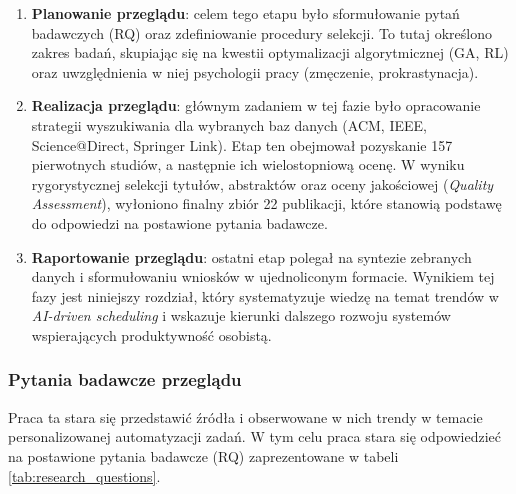 \begin{enumerate}
    \item \textbf{Planowanie przeglądu}: celem tego etapu było sformułowanie pytań badawczych (RQ) oraz zdefiniowanie procedury selekcji. To tutaj określono zakres badań, skupiając się na kwestii optymalizacji algorytmicznej (GA, RL) oraz uwzględnienia w niej psychologii pracy (zmęczenie, prokrastynacja).
    
    \item \textbf{Realizacja przeglądu}: głównym zadaniem w tej fazie było opracowanie strategii wyszukiwania dla wybranych baz danych (ACM, IEEE, Science@Direct, Springer Link). Etap ten obejmował pozyskanie 157 pierwotnych studiów, a następnie ich wielostopniową ocenę. W wyniku rygorystycznej selekcji tytułów, abstraktów oraz oceny jakościowej (\textit{Quality Assessment}), wyłoniono finalny zbiór 22 publikacji, które stanowią podstawę do odpowiedzi na postawione pytania badawcze.
    
    \item \textbf{Raportowanie przeglądu}: ostatni etap polegał na syntezie zebranych danych i sformułowaniu wniosków w ujednoliconym formacie. Wynikiem tej fazy jest niniejszy rozdział, który systematyzuje wiedzę na temat trendów w \textit{AI-driven scheduling} i wskazuje kierunki dalszego rozwoju systemów wspierających produktywność osobistą.
\end{enumerate}

    \subsubsection{Pytania badawcze przeglądu}
    \quad Praca ta stara się przedstawić źródła i obserwowane w nich trendy w temacie personalizowanej automatyzacji zadań. W tym celu praca stara się odpowiedzieć na postawione pytania badawcze (RQ) zaprezentowane w tabeli \ref{tab:research_questions}. 


